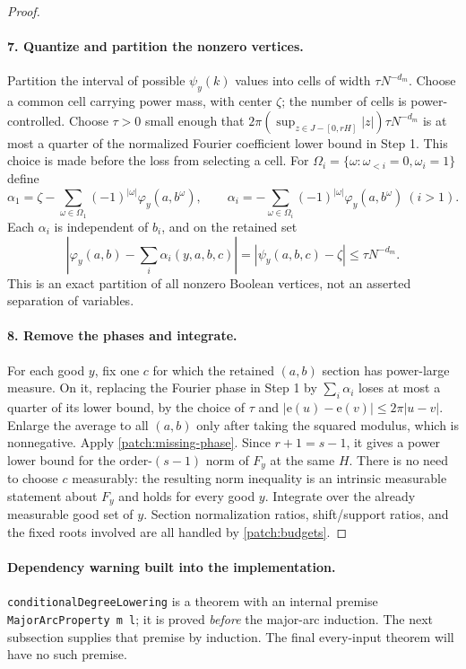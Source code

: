 \documentclass[11pt]{article}
\theoremstyle{definition}
\newcommand{\ee}[1]{\mathrm e\!\left(#1\right)}
\newcommand{\pid}[1]{\nolinkurl{#1}}
\begin{document}
\begin{proof}
\paragraph{7. Quantize and partition the nonzero vertices.}
Partition the interval of possible $\psi_y(k)$ values into cells of width $\tau N^{-d_m}$.
Choose a common cell carrying power mass, with center $\zeta$; the number of cells is
power-controlled.  Choose $\tau>0$ small enough that
$2\pi(\sup_{z\in J-[0,rH]}|z|)\tau N^{-d_m}$ is at most a quarter of the normalized Fourier
coefficient lower bound in Step 1.  This choice is made before the loss from selecting a cell.
For $\Omega_i=\{\omega:\omega_{<i}=0,\omega_i=1\}$ define
\[
 \alpha_1=\zeta-\sum_{\omega\in\Omega_1}(-1)^{|\omega|}\varphi_y(a,b^\omega),
 \qquad
 \alpha_i=-\sum_{\omega\in\Omega_i}(-1)^{|\omega|}\varphi_y(a,b^\omega)\ (i>1).
\]
Each $\alpha_i$ is independent of $b_i$, and on the retained set
\[
 \left|\varphi_y(a,b)-\sum_i\alpha_i(y,a,b,c)\right|
       =|\psi_y(a,b,c)-\zeta|\leq\tau N^{-d_m}.
\]
This is an exact partition of all nonzero Boolean vertices, not an asserted separation of
variables.

\paragraph{8. Remove the phases and integrate.}
For each good $y$, fix one $c$ for which the retained $(a,b)$ section has power-large measure.
On it, replacing the Fourier phase in Step 1 by $\sum_i\alpha_i$ loses at most a quarter of
its lower bound, by the choice of $\tau$ and $|\ee u-\ee v|\leq2\pi|u-v|$.
Enlarge the average to all $(a,b)$ only after taking the squared modulus, which is nonnegative.
Apply \cref{patch:missing-phase}.  Since $r+1=s-1$, it gives a power lower bound for the
order-$(s-1)$ norm of $F_y$ at the same $H$.
There is no need to choose $c$ measurably: the resulting norm inequality is an intrinsic
measurable statement about $F_y$ and holds for every good $y$.
Integrate over the already measurable good set of $y$.  Section normalization ratios,
shift/support ratios, and the fixed roots involved are all handled by \cref{patch:budgets}.
\end{proof}
\paragraph{Dependency warning built into the implementation.}
\pid{conditionalDegreeLowering} is a theorem with an internal premise
\pid{MajorArcProperty m l}; it is proved \emph{before} the major-arc induction.
The next subsection supplies that premise by induction.  The final every-input theorem
will have no such premise.
\end{document}
